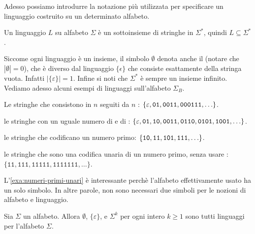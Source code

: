 Adesso possiamo introdurre la notazione più utilizzata per specificare un linguaggio costruito su un determinato alfabeto.


\begin{observation}\label{obs:linguaggio}
	Un linguaggio $L$ su alfabeto $\Sigma$ è un sottoinsieme di stringhe in $ \Sigma^*$,
	quindi $L\subseteq \Sigma^*$.
\end{observation}

Siccome ogni linguaggio è un insieme, il simbolo $\emptyset$ denota anche il  (notare che
$|\emptyset|=0$), che è
diverso dal linguaggio $\{\epsilon\}$ che consiste esattamente della stringa vuota.
Infatti $|\{\varepsilon\}|=1$.
Infine si noti che $\Sigma^*$ è sempre un insieme infinito.
Vediamo adesso alcuni esempi di linguaggi sull'alfabeto $\Sigma_{B}$.


\begin{example}\label{exa:0n01}
	Le stringhe che consistono in $n$ \zero seguiti da $n$ \uno:
	$\{\varepsilon,\mathtt{0}\mathtt{1},\mathtt{0}\mathtt{0}\mathtt{1}\mathtt{1},\mathtt{0}\mathtt{0}\mathtt{0}\mathtt{1}\mathtt{1}\mathtt{1},\ldots\}$.
\end{example}

\begin{example}\label{exa:01-stesso-numero}
	le stringhe con un uguale numero di \zero{} e di \uno{}:
	$\{\varepsilon,\mathtt{0}\mathtt{1},\mathtt{1}\mathtt{0},\mathtt{0}\mathtt{0}\mathtt{1}\mathtt{1},\mathtt{0}\mathtt{1}\mathtt{1}\mathtt{0},\mathtt{0}\mathtt{1}\mathtt{0}\mathtt{1},\mathtt{1}\mathtt{0}\mathtt{0}\mathtt{1},\ldots\}$.
\end{example}

\begin{example}\label{exa:numeri-primi-binari}
	le stringhe che codificano un numero primo:
	$\{\mathtt{1}\mathtt{0},\mathtt{1}\mathtt{1},\mathtt{1}\mathtt{0}\mathtt{1}, \mathtt{1}\mathtt{1}\mathtt{1}, \ldots\}$.
\end{example}

\begin{example}\label{exa:numeri-primi-unari}
	le stringhe che sono una codifica unaria di un numero primo, senza usare \zero:
	$\{\mathtt{11},\mathtt{111},\mathtt{11111}, \mathtt{1111111}, \ldots\}$.
\end{example}

L'\cref{exa:numeri-primi-unari} è interessante perchè l'alfabeto effettivamente usato ha un solo simbolo.
In altre parole, non sono necessari due simboli per le nozioni di alfabeto e linguaggio.


\begin{observation}\label{obs:linguaggi-banali}
	Sia $\Sigma$ un alfabeto.
	Allora $\emptyset$, $\{\varepsilon\}$, e $\Sigma^{k}$ per ogni intero $k\ge 1$ sono tutti linguaggi per l'alfabeto $\Sigma$.
\end{observation}

